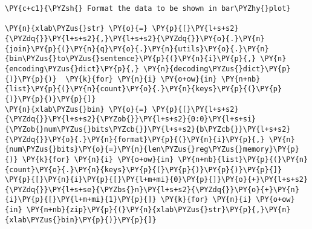     \begin{tcolorbox}[breakable, size=fbox, boxrule=1pt, pad at break*=1mm,colback=cellbackground, colframe=cellborder]
\begin{Verbatim}[commandchars=\\\{\}]
\PY{c+c1}{\PYZsh{} Format the data to be shown in bar\PYZhy{}plot}

\PY{n}{xlab\PYZus{}str} \PY{o}{=} \PY{p}{[}\PY{l+s+s2}{\PYZdq{}}\PY{l+s+s2}{,}\PY{l+s+s2}{\PYZdq{}}\PY{o}{.}\PY{n}{join}\PY{p}{(}\PY{n}{q}\PY{o}{.}\PY{n}{utils}\PY{o}{.}\PY{n}{bin\PYZus{}to\PYZus{}sentence}\PY{p}{(}\PY{n}{i}\PY{p}{,} \PY{n}{encoding\PYZus{}dict}\PY{p}{,} \PY{n}{decoding\PYZus{}dict}\PY{p}{)}\PY{p}{)}  \PY{k}{for} \PY{n}{i} \PY{o+ow}{in} \PY{n+nb}{list}\PY{p}{(}\PY{n}{count}\PY{o}{.}\PY{n}{keys}\PY{p}{(}\PY{p}{)}\PY{p}{)}\PY{p}{]}
\PY{n}{xlab\PYZus{}bin} \PY{o}{=} \PY{p}{[}\PY{l+s+s2}{\PYZdq{}}\PY{l+s+s2}{\PYZob{}}\PY{l+s+s2}{0:0}\PY{l+s+si}{\PYZob{}num\PYZus{}bits\PYZcb{}}\PY{l+s+s2}{b\PYZcb{}}\PY{l+s+s2}{\PYZdq{}}\PY{o}{.}\PY{n}{format}\PY{p}{(}\PY{n}{i}\PY{p}{,} \PY{n}{num\PYZus{}bits}\PY{o}{=}\PY{n}{len\PYZus{}reg\PYZus{}memory}\PY{p}{)} \PY{k}{for} \PY{n}{i} \PY{o+ow}{in} \PY{n+nb}{list}\PY{p}{(}\PY{n}{count}\PY{o}{.}\PY{n}{keys}\PY{p}{(}\PY{p}{)}\PY{p}{)}\PY{p}{]}
\PY{p}{[}\PY{n}{i}\PY{p}{[}\PY{l+m+mi}{0}\PY{p}{]}\PY{o}{+}\PY{l+s+s2}{\PYZdq{}}\PY{l+s+se}{\PYZbs{}n}\PY{l+s+s2}{\PYZdq{}}\PY{o}{+}\PY{n}{i}\PY{p}{[}\PY{l+m+mi}{1}\PY{p}{]} \PY{k}{for} \PY{n}{i} \PY{o+ow}{in} \PY{n+nb}{zip}\PY{p}{(}\PY{n}{xlab\PYZus{}str}\PY{p}{,}\PY{n}{xlab\PYZus{}bin}\PY{p}{)}\PY{p}{]}


\end{Verbatim}
\end{tcolorbox}
